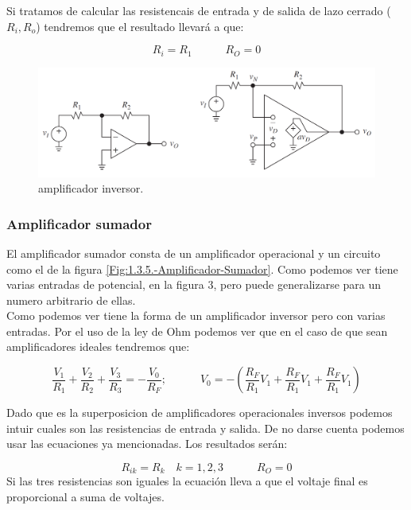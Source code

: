 \documentclass[12pt,a4paper]{article}
\numberwithin{equation}{section}
\numberwithin{figure}{section}
\newcommand{\parentesis}[1]{\left( #1  \right)}
\newcommand{\tquad}{\quad \quad \quad}
\begin{document}
Si tratamos de calcular las resistencais de entrada y de salida de lazo cerrado ($R_i, R_o$) tendremos que el resultado llevará a que:

\begin{equation}
R_i = R_1 \tquad R_O = 0
\end{equation}




\begin{figure}[t] \centering
\includegraphics[scale=0.4]{1.4-Amplificador-inversor.png}
\caption{amplificador inversor.}
\label{Fig:1.4-Amplificador-Inversor}
\end{figure} 


\subsubsection{Amplificador sumador}

El amplificador sumador consta de un amplificador operacional y un circuito como el de la figura \ref{Fig:1.3.5.-Amplificador-Sumador}. Como podemos ver tiene varias entradas de potencial, en la figura 3, pero puede generalizarse para un numero arbitrario de ellas.\\

Como podemos ver tiene la forma de un amplificador inversor pero con varias entradas. Por el uso de la ley de Ohm podemos ver que en el caso de que sean amplificadores ideales tendremos que:

\begin{equation}
\dfrac{V_1}{R_1}+\dfrac{V_2}{R_2}+\dfrac{V_3}{R_3}=-\dfrac{V_0}{R_F}; \tquad V_0 = - \parentesis{\dfrac{R_F}{R_1}V_1+\dfrac{R_F}{R_1}V_1+\dfrac{R_F}{R_1}V_1}
\end{equation}

Dado que es la superposicion de amplificadores operacionales inversos podemos intuir cuales son las resistencias de entrada y salida. De no darse cuenta podemos usar las ecuaciones ya mencionadas. Los resultados serán:

\begin{equation}
R_{ik} = R_k \quad k =1,2,3 \tquad R_O=0
\end{equation}
Si las tres resistencias son iguales la ecuación lleva a que el voltaje final es proporcional a suma de voltajes.
\end{document}
